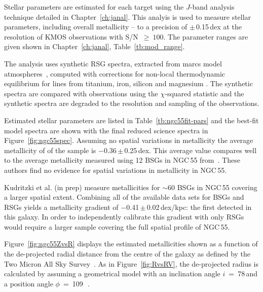 Stellar parameters are estimated for each target using the $J$-band analysis technique detailed in Chapter~\ref{ch:janal}.
This analyis is used to measure stellar parameters, including overall metallicity -- to a precision of $\pm$\,0.15\,dex at the resolution of KMOS observations with S/N~$\ge~100$.
The parameter ranges are given shown in Chapter~\ref{ch:janal}, Table~\ref{tb:mod_range}.

The analysis uses synthetic RSG spectra, extracted from {\sc marcs} model atmospheres~\citep{2008A&A...486..951G},
computed with corrections for non-local thermodynamic equilibrium for lines from titanium, iron, silicon and magnesium
\citep{2012ApJ...751..156B,2013ApJ...764..115B,2015ApJ...804..113B}.
The synthetic spectra are compared with observations using the $\chi$-squared statistic and the synthetic spectra are degraded to the resolution and sampling of the observations.

Estimated stellar parameters are listed in Table~\ref{tb:ngc55fit-pars} and the best-fit model spectra are shown with the final reduced science spectra in Figure~\ref{fig:ngc55spec}.
Assuming no spatial variations in metallicity the average metallicity of of the sample is $-$0.36\,$\pm$\,0.25\,dex.
This average value compares well to the average metallicity measured using 12 BSGs in NGC\,55 from~\citep[$-$0.4\,$\pm$\,0.13]{2012A&A...542A..79C}.
These authors find no evidence for spatial variations in metallicity in NGC\,55.

Kudritzki et al. (in prep) measure metallicities for $\sim$60 BSGs in NGC\,55 covering a larger spatial extent.
Combining all of the available data sets for BSGs and RSGs yields a metallicity gradient of $-$0.41\,$\pm$\,0.02\,dex/kpc: the first detected in this galaxy.
In order to independently calibrate this gradient with only RSGs would require a larger sample covering the full spatial profile of NGC\,55.

Figure~\ref{fig:ngc55ZvsR} displays the estimated metallicities shown as a function of the de-projected radial distance from the centre of the galaxy as defined by the Two Micron All Sky Survey~\citep[2MASS;][]{2006AJ....131.1163S}.
As in Figure~\ref{fig:RvsRV}, the de-projected radius is calculated by assuming a geometrical model with an inclination angle $i$~=~78\,\textdegree and a position angle $\phi$~=~109\,\textdegree~\citep{1991AJ....101..447P}.




